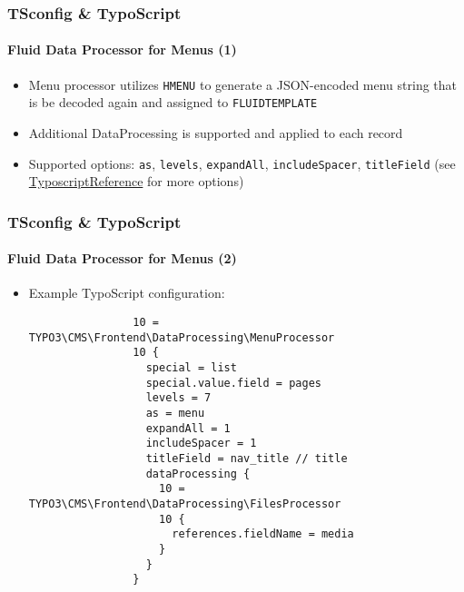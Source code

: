 \begin{frame}[fragile]
	\frametitle{TSconfig \& TypoScript}
	\framesubtitle{Fluid Data Processor for Menus (1)}

	\begin{itemize}
		\item Menu processor utilizes \texttt{HMENU} to generate a JSON-encoded menu string
			that is be decoded again and assigned to \texttt{FLUIDTEMPLATE}
		\item Additional DataProcessing is supported and applied to each record
		\item Supported options: \texttt{as}, \texttt{levels}, \texttt{expandAll}, \texttt{includeSpacer},
			\texttt{titleField}
			(see \href{https://docs.typo3.org/typo3cms/TyposcriptReference/ContentObjects/Hmenu/Index.html}{TyposcriptReference} for more options)
	\end{itemize}

\end{frame}

\begin{frame}[fragile]
	\frametitle{TSconfig \& TypoScript}
	\framesubtitle{Fluid Data Processor for Menus (2)}

	\lstset{basicstyle=\tiny\ttfamily}

	\begin{itemize}
		\item Example TypoScript configuration:

			\begin{lstlisting}
				10 = TYPO3\CMS\Frontend\DataProcessing\MenuProcessor
				10 {
				  special = list
				  special.value.field = pages
				  levels = 7
				  as = menu
				  expandAll = 1
				  includeSpacer = 1
				  titleField = nav_title // title
				  dataProcessing {
				    10 = TYPO3\CMS\Frontend\DataProcessing\FilesProcessor
				    10 {
				      references.fieldName = media
				    }
				  }
				}
			\end{lstlisting}

	\end{itemize}

\end{frame}

